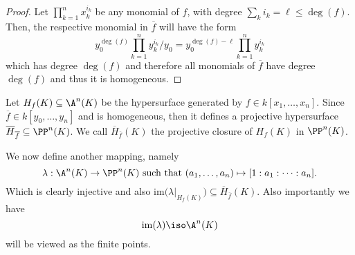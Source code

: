 \begin{proof}
    Let \(\prod_{k=1}^n x_k^{i_k}\) be any monomial of \(f\), with degree
    \(\sum_k i_k = \ell \leqslant \deg(f)\). Then, the respective monomial in
    \(\overline{f}\) will have the form \[y_0^{\deg(f)}\prod_{k=1}^n
        y_k^{i_k}/y_0 = y_0^{\deg(f) - \ell} \prod_{k=1}^n y_k^{i_k}\] which
    has degree \(\deg(f)\) and therefore all monomials of \(\overline{f}\) have
    degree \(\deg(f)\) and thus it is homogeneous.
\end{proof}

\begin{definition}
    Let \(H_f(K) \subseteq \A^n(K)\) be the hypersurface generated by \(f \in
    k[x_1, \dots, x_n]\).  Since  \(\overline{f} \in k[y_0, \dots, y_n]\) and is
    homogeneous, then it defines a projective hypersurface
    \(\overline{H}_{\overline{f}} \subseteq \PP^n(K)\). We call
    \(\overline{H}_{\overline{f}}(K)\) the projective closure of \(H_f(K)\) in
    \(\PP^n(K)\).
\end{definition}

\begin{definition}
    We now define another mapping, namely
    \[
        \lambda : \A^n(K) \to \PP^n(K) \text{ such that } (a_1, \dots, a_n)
        \mapsto [1 : a_1 : \cdots : a_n].
    \]
    Which is clearly injective and also \(\mathrm{im}\big(
    \lambda\big|_{H_f(K)}\big) \subseteq \overline{H}_{\overline{f}}(K)\). Also
    importantly we have
    \[
        \mathrm{im}(\lambda) \iso \A^n(K)
    \]
    will be viewed as the finite points.
\end{definition}
